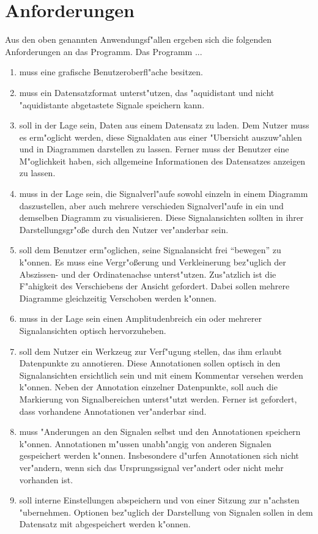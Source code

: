 \section{Anforderungen}

Aus den oben genannten Anwendungsf"allen ergeben sich die folgenden Anforderungen an das Programm.
Das Programm ...
\renewcommand{\theenumi}{\Alph{enumi}}
\renewcommand{\labelenumi}{\theenumi )}
\newcommand{\AF}[1]{\item \label{AF:#1}}
\begin{enumerate}
	\AF{gui} muss eine grafische Benutzeroberfl"ache besitzen.
	\AF{datensatz} muss ein Datensatzformat unterst"utzen, das "aquidistant und nicht "aquidistante abgetastete Signale speichern kann.
	\AF{datenmanagement} soll in der Lage sein, Daten aus einem Datensatz zu laden.
						 Dem Nutzer muss es erm"oglicht werden, diese Signaldaten aus einer "Ubersicht auszuw"ahlen und in Diagrammen darstellen zu lassen.
						 Ferner muss der Benutzer eine M"oglichkeit haben, sich allgemeine Informationen des Datensatzes anzeigen zu lassen.
	\AF{diagramm} muss in der Lage sein, die Signalverl"aufe sowohl einzeln in einem Diagramm daszustellen, aber auch mehrere verschieden Signalverl"aufe in ein und demselben Diagramm zu visualisieren.
				  Diese Signalansichten sollten in ihrer Darstellungsgr"o\ss e durch den Nutzer ver"anderbar sein.
	\AF{ansicht} soll dem Benutzer erm"oglichen, seine Signalansicht frei "`bewegen"' zu k"onnen.
				 Es muss eine Vergr"o\ss erung und Verkleinerung bez"uglich der Abszissen- und der Ordinatenachse unterst"utzen.
				 Zus"atzlich ist die F"ahigkeit des Verschiebens der Ansicht gefordert.
				 Dabei sollen mehrere Diagramme gleichzeitig Verschoben werden k"onnen.
	\AF{amplitudenmarkierung} muss in der Lage sein einen Amplitudenbreich ein oder mehrerer Signalansichten optisch hervorzuheben.
	\AF{annotationen} soll dem Nutzer ein Werkzeug zur Verf"ugung stellen, das ihm erlaubt Datenpunkte zu annotieren.
					  Diese Annotationen sollen optisch in den Signalansichten ersichtlich sein und mit einem Kommentar versehen werden k"onnen.
					  Neben der Annotation einzelner Datenpunkte, soll auch die Markierung von Signalbereichen unterst"utzt werden.
					  Ferner ist gefordert, dass vorhandene Annotationen ver"anderbar sind.
	\AF{io} muss "Anderungen an den Signalen selbst und den Annotationen speichern k"onnen.
			Annotationen m"ussen unabh"angig von anderen Signalen gespeichert werden k"onnen.
			Insbesondere d"urfen Annotationen sich nicht ver"andern, wenn sich das Ursprungssignal ver"andert oder nicht mehr vorhanden ist.
	\AF{einstellungen} soll interne Einstellungen abspeichern und von einer Sitzung zur n"achsten "ubernehmen.
					   Optionen bez"uglich der Darstellung von Signalen sollen in dem Datensatz mit abgespeichert werden k"onnen.
\end{enumerate}

